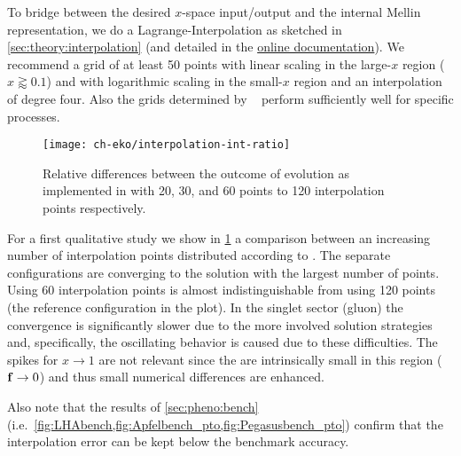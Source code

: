 To bridge between the desired $x$-space input/output and the internal
Mellin representation, we do a Lagrange-Interpolation as sketched in
\cref{sec:theory:interpolation}
(and detailed in the \href{https://eko.readthedocs.io/en/latest/}{online documentation}).
We recommend a grid of at least 50 points with
linear scaling in the large-$x$ region ($x \gtrapprox 0.1$) and with logarithmic
scaling in the small-$x$ region and an interpolation of degree four.
Also the grids determined by \amcfast~\cite{Bertone:2014zva} perform
sufficiently well for specific processes.

\begin{figure}
    \begin{center}
    \texttt{[image: ch-eko/interpolation-int-ratio]}
    \end{center}
    \caption{Relative differences between 
        the outcome of \nnlo{} \qcd{} evolution
        as implemented in \eko{} with 20, 30, and 60 points to 120
        interpolation points respectively.
        \label{fig:eko/interpolation} }
\end{figure}

For a first qualitative study we show in \cref{fig:eko/interpolation} a
comparison between an increasing number of interpolation points
distributed according to \cite[Eq. 2.12]{Carrazza_2020}.
The separate configurations are converging to the solution with the
largest number of points. Using 60 interpolation points is almost
indistinguishable from using 120 points (the reference configuration in the plot).
In the singlet sector (gluon) the convergence is
significantly slower due to the more involved solution strategies and,
specifically, the oscillating behavior is caused due to these difficulties.
The spikes for $x\to 1$ are not relevant since the \pdfs are intrinsically
small in this region ($\vb f\to 0$) and thus small numerical differences
are enhanced.

Also note that the results of \cref{sec:pheno:bench} (i.e.\ \cref{fig:LHAbench,fig:Apfelbench_pto,fig:Pegasusbench_pto}) confirm that
the interpolation error can be kept below the benchmark accuracy.
